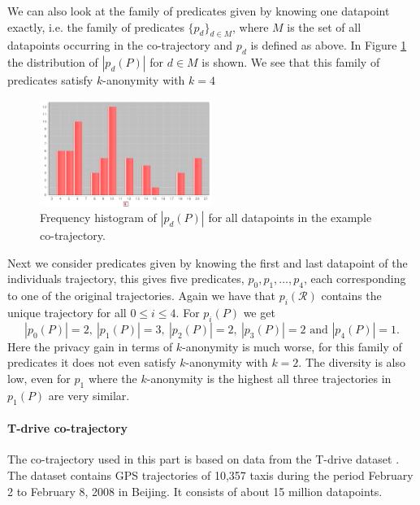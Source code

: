 \documentclass[12pt]{article}
\newcommand{\data}{d}
\newcommand{\cotraj}{\mathcal{R}}
\newcommand{\pred}{p}
\newcommand{\paths}{P}
\theoremstyle{definition}
\begin{document}
We can also look at the family of predicates given by knowing one
datapoint exactly, i.e. the family of predicates
\(\{\pred_{\data}\}_{\data \in M}\), where \(M\) is the set of all
datapoints occurring in the co-trajectory and \(\pred_{\data}\) is
defined as above. In Figure \ref{fig:paths-dist} the distribution of
\(|\pred_{\data}(\paths)|\) for \(\data \in M\) is shown. We see that
this family of predicates satisfy \(k\)-anonymity with \(k = 4\)

\begin{figure}
  \centering
  \includegraphics[width=0.5\textwidth]{figures/paths-dist.pdf}
  \caption{Frequency histogram of \(|\pred_{\data}(\paths)|\) for all
    datapoints in the example co-trajectory.}
  \label{fig:paths-dist}
\end{figure}

Next we consider predicates given by knowing the first and last
datapoint of the individuals trajectory, this gives five predicates,
\(\pred_{0}, \pred_{1}, \dots, \pred_{4}\), each corresponding to one
of the original trajectories. Again we have that
\(\pred_{i}(\cotraj)\) contains the unique trajectory for all
\(0 \leq i \leq 4\). For \(\pred_{i}(\paths)\) we get
\begin{equation*}
  |\pred_{0}(\paths)| = 2,\
  |\pred_{1}(\paths)| = 3,\
  |\pred_{2}(\paths)| = 2,\
  |\pred_{3}(\paths)| = 2 \text{ and }
  |\pred_{4}(\paths)| = 1.
\end{equation*}
Here the privacy gain in terms of \(k\)-anonymity is much worse, for
this family of predicates it does not even satisfy \(k\)-anonymity
with \(k = 2\). The diversity is also low, even for \(\pred_{1}\)
where the \(k\)-anonymity is the highest all three trajectories in
\(\pred_{1}(\paths)\) are very similar.

\paragraph{T-drive co-trajectory}
The co-trajectory used in this part is based on data from the T-drive
dataset \cite{yuan_driving_2011, yuan_t-drive:_2010}. The dataset
contains GPS trajectories of 10,357 taxis during the period February 2
to February 8, 2008 in Beijing. It consists of about 15 million
datapoints.
\end{document}

